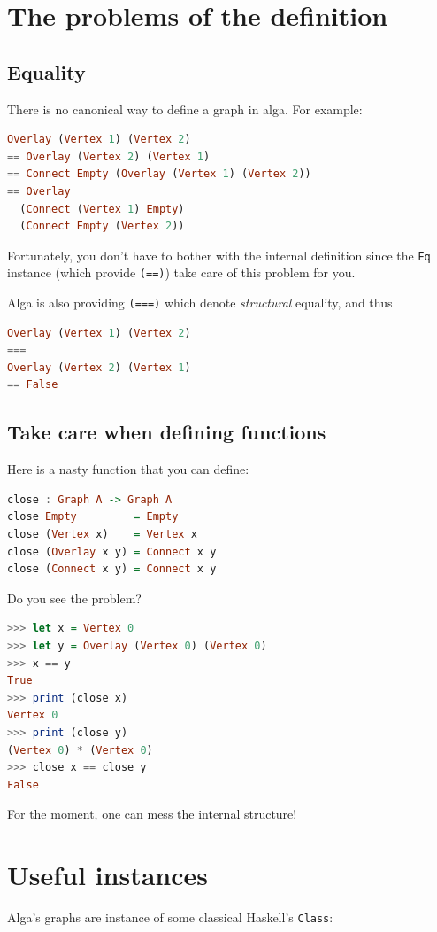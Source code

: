 \documentclass[10pt,a4paper]{article}
\begin{document}
\section{The problems of the definition}
\subsection{Equality}
There is no canonical way to define a graph in alga. For example:
\begin{lstlisting}[language=Haskell, frame=single]
Overlay (Vertex 1) (Vertex 2)
== Overlay (Vertex 2) (Vertex 1)
== Connect Empty (Overlay (Vertex 1) (Vertex 2))
== Overlay 
  (Connect (Vertex 1) Empty)
  (Connect Empty (Vertex 2))
\end{lstlisting}
 
Fortunately, you don't have to bother with the internal definition since the \verb|Eq| instance (which provide \verb|(==)|) take care of this problem for you.

Alga is also providing \verb|(===)| which denote \emph{structural} equality, and thus
 
\begin{lstlisting}[language=Haskell, frame=single]
Overlay (Vertex 1) (Vertex 2)
===
Overlay (Vertex 2) (Vertex 1)
== False
\end{lstlisting}

\subsection{Take care when defining functions}
Here is a nasty function that you can define:
\begin{lstlisting}[language=Haskell, frame=single]
close : Graph A -> Graph A
close Empty         = Empty
close (Vertex x)    = Vertex x
close (Overlay x y) = Connect x y
close (Connect x y) = Connect x y
\end{lstlisting}

Do you see the problem?
\begin{lstlisting}[language=Haskell, frame=single]
>>> let x = Vertex 0
>>> let y = Overlay (Vertex 0) (Vertex 0)
>>> x == y
True
>>> print (close x)
Vertex 0
>>> print (close y)
(Vertex 0) * (Vertex 0)
>>> close x == close y
False
\end{lstlisting}
For the moment, one can mess the internal structure!
 
\section{Useful instances}
Alga's graphs are instance of some classical Haskell's \verb|Class|:
\end{document}
